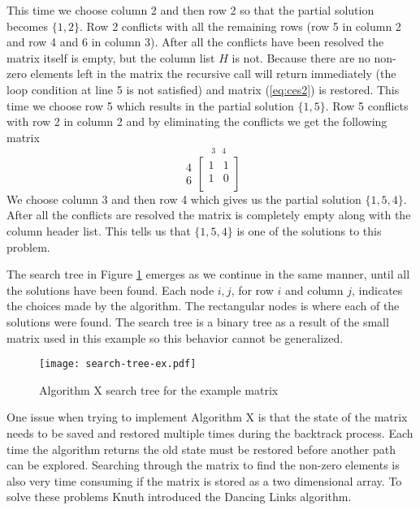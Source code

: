 This time we choose column 2 and then row 2 so that the partial solution becomes $\{ 1, 2 \}$.
Row 2 conflicts with all the remaining rows (row 5 in column 2 and row 4 and 6 in column 3).
After all the conflicts have been resolved the matrix itself is empty, but the column list $H$ is not.
Because there are no non-zero elements left in the matrix the recursive call will return immediately (the loop condition at line 5 is not satisfied) and matrix (\ref{eq:ces2}) is restored.
This time we choose row 5 which results in the partial solution $\{ 1, 5 \}$.
Row 5 conflicts with row 2 in column 2 and by eliminating the conflicts we get the following matrix
\begin{equation*}
	\label{eq:ces3}
	\begin{array}{r} 4\\ 6 \end{array}
	\stackrel{
		\begin{array}{ccc} 3 & 4 \end{array}
	}{
		\begin{bmatrix}
			1 & 1 \\
			1 & 0 \\
		\end{bmatrix}
	}
\end{equation*}
We choose column 3 and then row 4 which gives us the partial solution $\{ 1, 5, 4 \}$.
After all the conflicts are resolved the matrix is completely empty along with the column header list.
This tells us that $\{ 1, 5, 4 \}$ is one of the solutions to this problem.

The search tree in Figure \ref{fig:ex_tree} emerges as we continue in the same manner, until all the solutions have been found.
Each node $i,j$, for row $i$ and column $j$, indicates the choices made by the algorithm.
The rectangular nodes is where each of the solutions were found.
The search tree is a binary tree as a result of the small matrix used in this example so this behavior cannot be generalized.
\begin{figure}[htbp]
	\centering 
	\texttt{[image: search-tree-ex.pdf]}
	\caption{Algorithm X search tree for the example matrix}
	\label{fig:ex_tree}
\end{figure}

One issue when trying to implement Algorithm X is that the state of the matrix needs to be saved and restored multiple times during the backtrack process.
Each time the algorithm returns the old state must be restored before another path can be explored.
Searching through the matrix to find the non-zero elements is also very time consuming if the matrix is stored as a two dimensional array.
To solve these problems Knuth introduced the Dancing Links algorithm.



